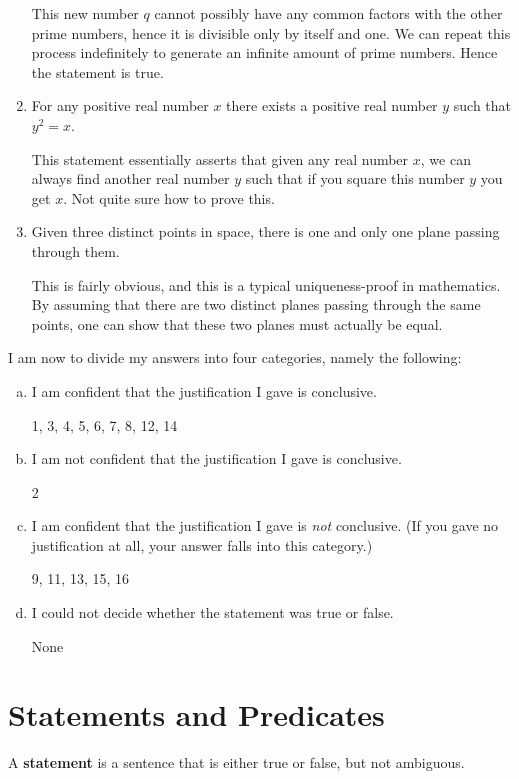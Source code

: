 \documentclass[a4paper, 11pt]{report}
\theoremstyle{plain}
\theoremstyle{definition}
\begin{document}
\begin{enumerate}
    This new number $q$ cannot possibly have any common factors with the
    other prime numbers, hence it is divisible only by itself and one.  We
    can repeat this process indefinitely to generate an infinite amount of
    prime numbers. Hence the statement is true.

  \item For any positive real number $x$ there exists a positive real number $y$ such that $y^2 = x$.

    This statement essentially asserts that given any real number $x$, we
    can always find another real number $y$ such that if you square this
    number $y$ you get $x$. Not quite sure how to prove this.

  \item Given three distinct points in space, there is one and only one plane passing through them.

    This is fairly obvious, and this is a typical uniqueness-proof in
    mathematics. By assuming that there are two distinct planes passing
    through the same points, one can show that these two planes must
    actually be equal.

\end{enumerate} 

I am now to divide my answers into four categories, namely the following:
\begin{enumerate}[a)]
  \item I am confident that the justification I gave is conclusive.

    1, 3, 4, 5, 6, 7, 8, 12, 14
  \item I am not confident that the justification I gave is conclusive.

    2
  \item I am confident that the justification I gave is \textit{not} conclusive. (If you gave no justification at all, your answer falls
    into this category.)

    9, 11, 13, 15, 16 
  \item I could not decide whether the statement was true or false.

    None
\end{enumerate}

\section{Statements and Predicates}
\label{sec:statements_and_predicates}

A \textbf{statement} is a sentence that is either true or false, but not ambiguous.
\end{document}
